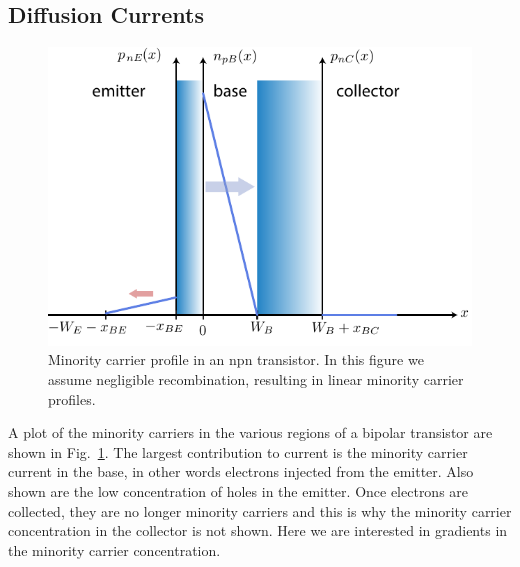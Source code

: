 \subsection{Diffusion Currents}
\begin{figure}[tb]
\centering
\includegraphics[width=.75\columnwidth]{slide10_minority_carriers}
\caption{Minority carrier profile in an npn transistor.  In this figure we assume negligible recombination, resulting in linear minority carrier profiles.}
\label{fig:slide10_minority_carriers}
\end{figure}
A plot of the minority carriers in the various regions of a bipolar transistor are shown in Fig.~\ref{fig:slide10_minority_carriers}.  The largest contribution to current is the minority carrier current in the base, in other words electrons injected from the emitter.  Also shown are the low concentration of holes in the emitter.  Once electrons are collected, they are no longer minority carriers and this is why the minority carrier concentration in the collector is not shown.  Here we are interested in gradients in the minority carrier concentration.
